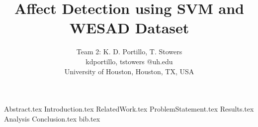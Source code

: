 \documentclass{IEEEtran}
\begin{document}
 
\title{Affect Detection using SVM and WESAD Dataset}
\author{Team 2: K. D. Portillo, T. Stowers \\
        kdportillo, tstowers @uh.edu \\
        University of Houston, Houston, TX, USA}
\maketitle
{}

{Abstract.tex}
{Introduction.tex}
{RelatedWork.tex}
{ProblemStatement.tex}
{Results.tex}
{Analysis}
{Conclusion.tex}
{bib.tex}
\end{document}
